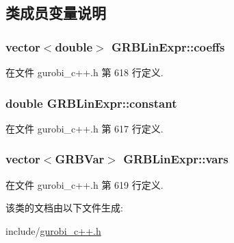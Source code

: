 \subsection{类成员变量说明}
\subsubsection[{\texorpdfstring{coeffs}{coeffs}}]{\setlength{\rightskip}{0pt plus 5cm}vector$<$double$>$ G\+R\+B\+Lin\+Expr\+::coeffs\hspace{0.3cm}{\ttfamily [private]}}\hypertarget{classGRBLinExpr_ae1b3b0796efe5b47e4607b56ce87ca1c}{}\label{classGRBLinExpr_ae1b3b0796efe5b47e4607b56ce87ca1c}


在文件 gurobi\+\_\+c++.\+h 第 618 行定义.

\subsubsection[{\texorpdfstring{constant}{constant}}]{\setlength{\rightskip}{0pt plus 5cm}double G\+R\+B\+Lin\+Expr\+::constant\hspace{0.3cm}{\ttfamily [private]}}\hypertarget{classGRBLinExpr_a3cbf5b4a570659fab686d349584d5614}{}\label{classGRBLinExpr_a3cbf5b4a570659fab686d349584d5614}


在文件 gurobi\+\_\+c++.\+h 第 617 行定义.

\subsubsection[{\texorpdfstring{vars}{vars}}]{\setlength{\rightskip}{0pt plus 5cm}vector$<${\bf G\+R\+B\+Var}$>$ G\+R\+B\+Lin\+Expr\+::vars\hspace{0.3cm}{\ttfamily [private]}}\hypertarget{classGRBLinExpr_a0cfef12c4fdb11e4c623007b03a61993}{}\label{classGRBLinExpr_a0cfef12c4fdb11e4c623007b03a61993}


在文件 gurobi\+\_\+c++.\+h 第 619 行定义.



该类的文档由以下文件生成\+:\begin{DoxyCompactItemize}
\item 
include/\hyperlink{gurobi__c_09_09_8h}{gurobi\+\_\+c++.\+h}\end{DoxyCompactItemize}
